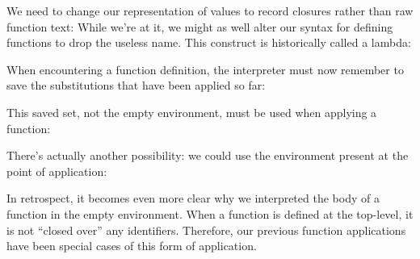 
We need to change our representation of values to record closures rather than
raw function text:
While we’re at it, we might as well alter our syntax for defining functions to
drop the useless name. This construct is historically called a lambda:

When encountering a function definition, the interpreter must now remember to
save the substitutions that have been applied so far:

This saved set, not the empty environment, must be used when applying a
function:

There’s actually another possibility: we could use the environment present at
the point of application:


In retrospect, it becomes even more clear why we interpreted the body of a
function in the empty environment. When a function is defined at the top-level,
it is not “closed over” any identifiers. Therefore, our previous function
applications have been special cases of this form of application.
